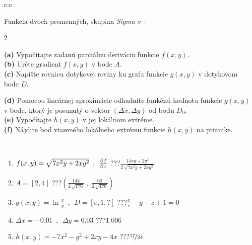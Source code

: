 \documentclass[10pt]{report}
\begin{document}
\begin{tabular}{c:c}
\begin{minipage}[c][104.5mm][t]{0.5\linewidth}
\begin{center}
\vspace{7mm}
{\huge \LARGE Funkcia dvoch premenných, skupina \textit{Sigma $\sigma$} -}\\[5mm]
\begin{minipage}{0.95\linewidth}
\begin{center}
{\small \begin{multicols}{2} \raggedright
\textbf{(a)} Vypočítajte zadanú parciálnu deriváciu funkcie \(f(x,y)\). \\[1mm]
\textbf{(b)} Určte gradient \(f(x,y)\) v bode \(A\). \\[1mm]
\textbf{(c)} Napíšte rovnicu dotykovej roviny ku grafu funkcie \(g(x,y)\) v dotykovom bode \(D\). \par \columnbreak
\textbf{(d)} Pomocou lineárnej aproximácie odhadnite funkčnú hodnotu funkcie \(g(x,y)\) v bode, ktorý je posunutý o vektor \((\Delta x, \Delta y)\) od bodu \(D_0\). \\[1mm]
\textbf{(e)} Vypočítajte \(h(x,y)\) v jej lokálnom extréme. \\[1mm]
\textbf{(f)} Nájdite bod viazeného lokálneho extrému funkcie \(h(x,y)\) na priamke. \\[1mm]
\end{multicols}
}
\end{center}
\end{minipage}
\\[4mm]
\begin{minipage}{0.79\linewidth}
\begin{center}
\begin{varwidth}{\linewidth}
\begin{enumerate}
\normalsizerr
\item $f(x,y) = \sqrt{7x^2y + 2xy^2}\enspace , \enspace \pdv{f}{x}$\quad \dotfill\; ???\;\dotfill \quad $\frac{14xy+2y^2}{2\,\sqrt{7x^2y+2xy^2}}$
\item $A = [2, 4]$\quad \dotfill\; ???\;\dotfill \quad $\left( \frac{144}{2\,\sqrt{176}} \;,\; \frac{60}{2\,\sqrt{176}} \right)$
\item $g(x,y) = \ln\frac{x}{y} \enspace , \enspace D=[e,1,?]$\quad \dotfill\; ???\;\dotfill \quad $\frac{x}{e} - y - z + 1 = 0$
\item $\Delta x = {-0.01} \enspace,\enspace \Delta y = {0.03}$\quad \dotfill\; ???\;\dotfill \quad $1.006$
\item $h(x,y) = -7x^2-y^2+2xy-4x$\quad \dotfill\; ???\;\dotfill \quad $\nicefrac{17}{24}$

\end{enumerate}
\end{varwidth}
\end{center}
\end{minipage}
\end{center}
\end{minipage}
\end{tabular}
\end{document}
